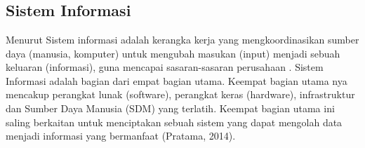%
%
%
%

\chapter{\babDua}

\section{Sistem Informasi}
Menurut  Sistem informasi adalah kerangka kerja yang mengkoordinasikan sumber daya (manusia, komputer) untuk mengubah masukan (input) menjadi sebuah keluaran (informasi), guna mencapai sasaran-sasaran perusahaan . Sistem Informasi adalah bagian dari empat bagian utama. Keempat bagian utama nya mencakup perangkat lunak (software), perangkat keras (hardware), infrastruktur dan Sumber Daya Manusia (SDM) yang terlatih. Keempat bagian utama ini saling berkaitan untuk menciptakan sebuah sistem yang dapat mengolah data menjadi informasi yang bermanfaat (Pratama, 2014).


